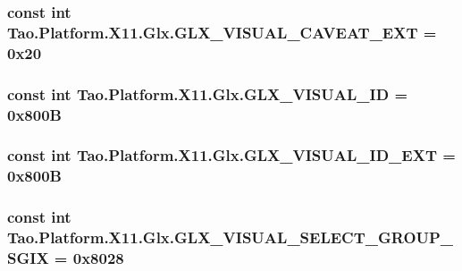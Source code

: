 \label{class_tao_1_1_platform_1_1_x11_1_1_glx_a772129eb8346c477e9cdc01efa76e24e}
\hypertarget{class_tao_1_1_platform_1_1_x11_1_1_glx_a115fc61ebf65a9448a116a74944299f3}{
\subsubsection[{GLX\_\-VISUAL\_\-CAVEAT\_\-EXT}]{\setlength{\rightskip}{0pt plus 5cm}const int {\bf Tao.Platform.X11.Glx.GLX\_\-VISUAL\_\-CAVEAT\_\-EXT} = 0x20}}
\label{class_tao_1_1_platform_1_1_x11_1_1_glx_a115fc61ebf65a9448a116a74944299f3}
\hypertarget{class_tao_1_1_platform_1_1_x11_1_1_glx_a6e069356f6070485b2c4d0d8224aa167}{
\subsubsection[{GLX\_\-VISUAL\_\-ID}]{\setlength{\rightskip}{0pt plus 5cm}const int {\bf Tao.Platform.X11.Glx.GLX\_\-VISUAL\_\-ID} = 0x800B}}
\label{class_tao_1_1_platform_1_1_x11_1_1_glx_a6e069356f6070485b2c4d0d8224aa167}
\hypertarget{class_tao_1_1_platform_1_1_x11_1_1_glx_a50a7a17fed6da4d8691aec98b882ad16}{
\subsubsection[{GLX\_\-VISUAL\_\-ID\_\-EXT}]{\setlength{\rightskip}{0pt plus 5cm}const int {\bf Tao.Platform.X11.Glx.GLX\_\-VISUAL\_\-ID\_\-EXT} = 0x800B}}
\label{class_tao_1_1_platform_1_1_x11_1_1_glx_a50a7a17fed6da4d8691aec98b882ad16}
\hypertarget{class_tao_1_1_platform_1_1_x11_1_1_glx_a2893e772610e2ca4b80c46216137bef2}{
\subsubsection[{GLX\_\-VISUAL\_\-SELECT\_\-GROUP\_\-SGIX}]{\setlength{\rightskip}{0pt plus 5cm}const int {\bf Tao.Platform.X11.Glx.GLX\_\-VISUAL\_\-SELECT\_\-GROUP\_\-SGIX} = 0x8028}}
